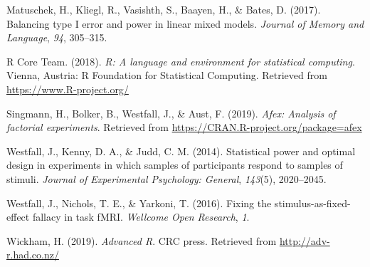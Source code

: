 \documentclass[english,doc,floatsintext]{apa6}
\begin{document}
\leavevmode\hypertarget{ref-matuschek_et_al_2017}{}%
Matuschek, H., Kliegl, R., Vasishth, S., Baayen, H., \& Bates, D. (2017). Balancing type I error and power in linear mixed models. \emph{Journal of Memory and Language}, \emph{94}, 305--315.

\leavevmode\hypertarget{ref-R-base}{}%
R Core Team. (2018). \emph{R: A language and environment for statistical computing}. Vienna, Austria: R Foundation for Statistical Computing. Retrieved from \url{https://www.R-project.org/}

\leavevmode\hypertarget{ref-R-afex}{}%
Singmann, H., Bolker, B., Westfall, J., \& Aust, F. (2019). \emph{Afex: Analysis of factorial experiments}. Retrieved from \url{https://CRAN.R-project.org/package=afex}

\leavevmode\hypertarget{ref-westfall_2014}{}%
Westfall, J., Kenny, D. A., \& Judd, C. M. (2014). Statistical power and optimal design in experiments in which samples of participants respond to samples of stimuli. \emph{Journal of Experimental Psychology: General}, \emph{143}(5), 2020--2045.

\leavevmode\hypertarget{ref-westfall_yarkoni_2016}{}%
Westfall, J., Nichols, T. E., \& Yarkoni, T. (2016). Fixing the stimulus-as-fixed-effect fallacy in task fMRI. \emph{Wellcome Open Research}, \emph{1}.

\leavevmode\hypertarget{ref-wickham-advr}{}%
Wickham, H. (2019). \emph{Advanced R}. CRC press. Retrieved from \url{http://adv-r.had.co.nz/}

\endgroup
\end{document}
